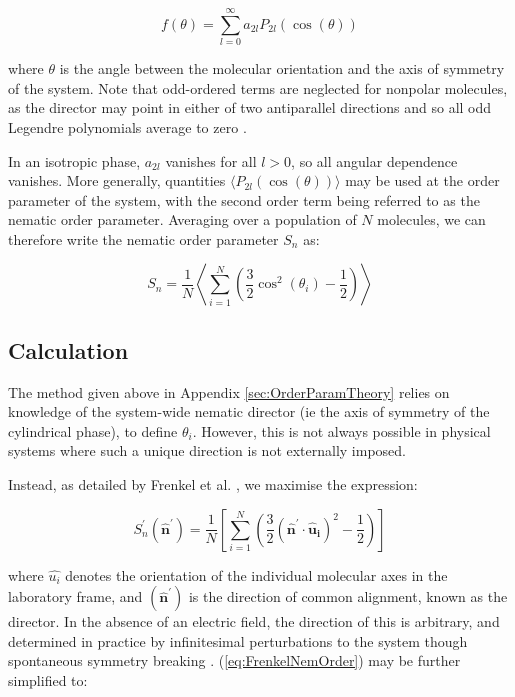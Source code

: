 \documentclass[11pt, a4paper]{article} %
\begin{document}
\begin{appendices}
\begin{equation}
f(\theta) = \sum_{l=0}^{\infty} a_{2l} P_{2l}(\cos(\theta))
\end{equation}

where $\theta$ is the angle between the molecular orientation and the axis of symmetry of the system. Note that odd-ordered terms are neglected for nonpolar molecules, as the director may point in either of two antiparallel directions and so all odd Legendre polynomials average to zero \cite{Parsons1979}.

In an isotropic phase, $a_{2l}$ vanishes for all $l>0$, so all angular dependence vanishes. More generally,  quantities $\langle P_{2l}(\cos(\theta)) \rangle$ may be used at the order parameter of the system, with the second order term being referred to as the nematic order parameter. Averaging over a population of $N$ molecules, we can therefore write the nematic order parameter $S_{n}$ as:

\begin{equation}
S_{n} = \frac{1}{N} \left\langle \sum_{i=1}^{N} \left( \frac{3}{2} \cos^{2}(\theta_{i})-\frac{1}{2} \right) \right\rangle
\end{equation}

\subsection{Calculation}\label{sec:OrderParamCalc}
The method given above in Appendix \ref{sec:OrderParamTheory} relies on knowledge of the system-wide nematic director (ie the axis of symmetry of the cylindrical phase), to define $\theta_{i}$. However, this is not always possible in physical systems where such a unique direction is not externally imposed.

Instead, as detailed by Frenkel et al. \cite{Frenkel1985}, we maximise the expression:

\begin{equation} \label{eq:FrenkelNemOrder}
S^{\prime}_{n}(\boldsymbol{\hat{n}^{\prime}}) = \frac{1}{N} \left[ \sum_{i=1}^{N} \left( \frac{3}{2} (\boldsymbol{\hat{n}^{\prime}} \cdot \boldsymbol{\hat{u}_{i}})^{2}-\frac{1}{2} \right) \right]
\end{equation}

where $\hat{u_{i}}$ denotes the orientation of the individual molecular axes in the laboratory frame, and $(\boldsymbol{\hat{n}^{\prime}})$ is the direction of common alignment, known as the director. In the absence of an electric field, the direction of this is arbitrary, and determined in practice by infinitesimal perturbations to the system though spontaneous symmetry breaking \cite{Forster2018}. (\ref{eq:FrenkelNemOrder}) may be further simplified to:


\end{appendices}
\end{document}
